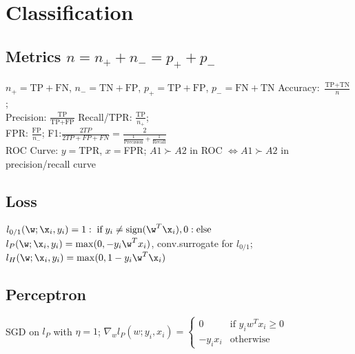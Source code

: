 \section*{Classification}
\subsection*{Metrics $n = n_+ + n_- = p_+ + p_-$}
$n_+ = \text{TP} + \text{FN}$, $n_- = \text{TN} + \text{FP}$, $p_+ = \text{TP} + \text{FP}$, $p_- = \text{FN} + \text{TN}$
Accuracy: $\frac{\text{TP}+\text{TN}}{n}$; \\
Precision: $\frac{\text{TP}}{\text{TP}+\text{FP}}$
Recall/TPR: $\frac{\text{TP}}{n_+}$; \\
FPR: $ \frac{\text{FP}}{n_-}$;
F1:$\frac{2TP}{2TP+FP+FN}=\frac{2}{\frac{1}{\text{Precision}}+\frac{1}{\text{Recall}}}$\\
ROC Curve: $y = $TPR, $x = $FPR; $A1 \succ A2$ in ROC $\Leftrightarrow A1 \succ A2$ in precision/recall curve
\subsection*{Loss}
$l_{0/1}(\w;\x_i,y_i)=1:\; \text{if}\;y_i\neq \text{sign}(\w^T\x_i), 0:\text{else}$\\
$l_{P}(\w;\x_i,y_i)=\max(0,-y_i\w^Tx_i)$, conv.surrogate for $l_{0/1}$;\\
$l_{H}(\w;\x_i,y_i)=\max(0,1-y_i\w^T\x_i)$
\subsection*{Perceptron}
SGD on $l_P$ with $\eta=1$;
$\nabla_w l_P(w;y_i,x_i) = 
\begin{cases}
    0 &\text{if } y_i w^T x_i \geq 0\\
    -y_i x_i &\text{otherwise}
\end{cases}$ \\

